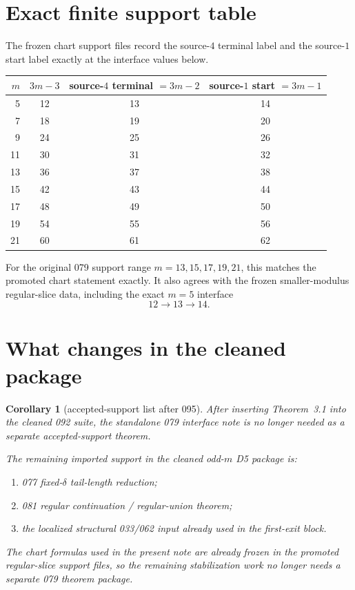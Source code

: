 \documentclass[11pt]{article}
\newtheorem{corollary}[theorem]{Corollary}
\begin{document}
\section{Exact finite support table}

The frozen chart support files record the source-$4$ terminal label and the
source-$1$ start label exactly at the interface values below.

\begin{center}
\begin{tabular}{rccc}
\hline
$m$ & $3m-3$ & source-$4$ terminal $=3m-2$ & source-$1$ start $=3m-1$ \\
\hline
5  & 12 & 13 & 14 \\
7  & 18 & 19 & 20 \\
9  & 24 & 25 & 26 \\
11 & 30 & 31 & 32 \\
13 & 36 & 37 & 38 \\
15 & 42 & 43 & 44 \\
17 & 48 & 49 & 50 \\
19 & 54 & 55 & 56 \\
21 & 60 & 61 & 62 \\
\hline
\end{tabular}
\end{center}

For the original 079 support range $m=13,15,17,19,21$, this matches the
promoted chart statement exactly. It also agrees with the frozen
smaller-modulus regular-slice data, including the exact $m=5$ interface
\[
12 \to 13 \to 14.
\]

\section{What changes in the cleaned package}

\begin{corollary}[accepted-support list after 095]
After inserting Theorem~3.1 into the cleaned 092 suite, the standalone 079
interface note is no longer needed as a separate accepted-support theorem.

The remaining imported support in the cleaned odd-$m$ D5 package is:
\begin{enumerate}[label=\textup{(\arabic*)},leftmargin=2.5em]
\item 077 fixed-$\delta$ tail-length reduction;
\item 081 regular continuation / regular-union theorem;
\item the localized structural 033/062 input already used in the first-exit
      block.
\end{enumerate}

The chart formulas used in the present note are already frozen in the promoted
regular-slice support files, so the remaining stabilization work no longer
needs a separate 079 theorem package.
\end{corollary}
\end{document}
